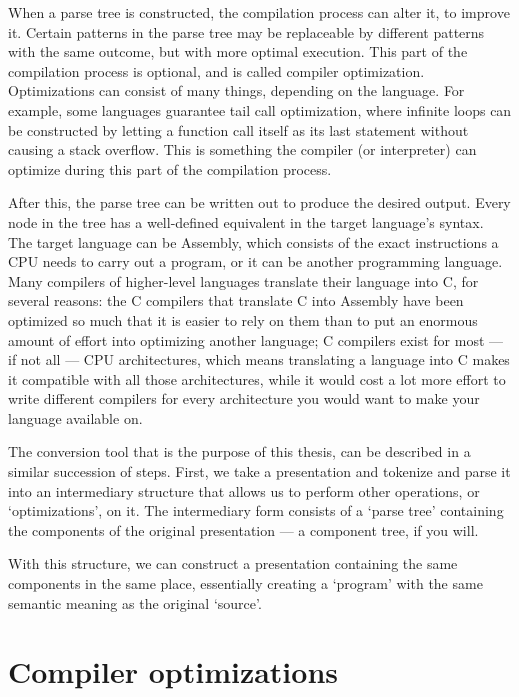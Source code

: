 \documentclass[a4paper,12pt]{report}
\begin{document}
   When a parse tree is constructed, the compilation process can alter it, to
   improve it. Certain patterns in the parse tree may be replaceable by
   different patterns with the same outcome, but with more optimal execution.
   This part of the compilation process is optional, and is called compiler
   optimization. Optimizations can consist of many things, depending on the
   language. For example, some languages guarantee tail call optimization,
   where infinite loops can be constructed by letting a function call itself as
   its last statement without causing a stack overflow. This is something the
   compiler (or interpreter) can optimize during this part of the compilation
   process.

   After this, the parse tree can be written out to produce the desired output.
   Every node in the tree has a well-defined equivalent in the target
   language's syntax. The target language can be Assembly, which consists of
   the exact instructions a CPU needs to carry out a program, or it can be
   another programming language. Many compilers of higher-level languages
   translate their language into C, for several reasons: the C compilers that
   translate C into Assembly have been optimized so much that it is easier to
   rely on them than to put an enormous amount of effort into optimizing
   another language; C compilers exist for most --- if not all --- CPU
   architectures, which means translating a language into C makes it compatible
   with all those architectures, while it would cost a lot more effort to write
   different compilers for every architecture you would want to make your
   language available on.

   The conversion tool that is the purpose of this thesis, can be described in
   a similar succession of steps. First, we take a \ppt presentation and
   tokenize and parse it into an intermediary structure that allows us to
   perform other operations, or `optimizations', on it. The intermediary form
   consists of a `parse tree' containing the components of the original
   presentation --- a component tree, if you will.

   With this structure, we can construct a \mxp presentation containing the
   same components in the same place, essentially creating a `program' with the
   same semantic meaning as the original `source'.

  \section{Compiler optimizations}
\end{document}
